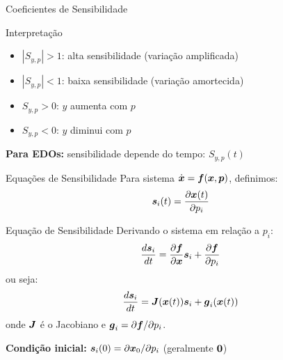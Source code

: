 \begin{frame}[allowframebreaks]{Coeficientes de Sensibilidade}

\vspace{0.3cm}

\begin{block}{Interpretação}
\begin{itemize}
    \item $|S_{y,p}| > 1$: alta sensibilidade (variação amplificada)
    \item $|S_{y,p}| < 1$: baixa sensibilidade (variação amortecida)
    \item $S_{y,p} > 0$: $y$ aumenta com $p$
    \item $S_{y,p} < 0$: $y$ diminui com $p$
\end{itemize}
\end{block}

\vspace{0.3cm}

\textbf{Para EDOs:} sensibilidade depende do tempo: $S_{y,p}(t)$
\end{frame}

\begin{frame}[allowframebreaks]{Equações de Sensibilidade}
Para sistema $\dot{\boldsymbol{x}} = \boldsymbol{f}(\boldsymbol{x}, \boldsymbol{p})$, definimos:
\begin{equation*}
\boldsymbol{s}_i(t) = \frac{\partial \boldsymbol{x}(t)}{\partial p_i}
\end{equation*}

\vspace{0.3cm}

\begin{block}{Equação de Sensibilidade}
Derivando o sistema em relação a $p_i$:
\begin{equation*}
\frac{d\boldsymbol{s}_i}{dt} = \frac{\partial \boldsymbol{f}}{\partial \boldsymbol{x}} \boldsymbol{s}_i + \frac{\partial \boldsymbol{f}}{\partial p_i}
\end{equation*}
ou seja:
\begin{equation*}
\frac{d\boldsymbol{s}_i}{dt} = \boldsymbol{J}(\boldsymbol{x}(t)) \boldsymbol{s}_i + \boldsymbol{g}_i(\boldsymbol{x}(t))
\end{equation*}
onde $\boldsymbol{J}$ é o Jacobiano e $\boldsymbol{g}_i = \partial \boldsymbol{f}/\partial p_i$.
\end{block}

\vspace{0.3cm}

\textbf{Condição inicial:} $\boldsymbol{s}_i(0) = \partial \boldsymbol{x}_0/\partial p_i$ (geralmente $\boldsymbol{0}$)

\end{frame}

